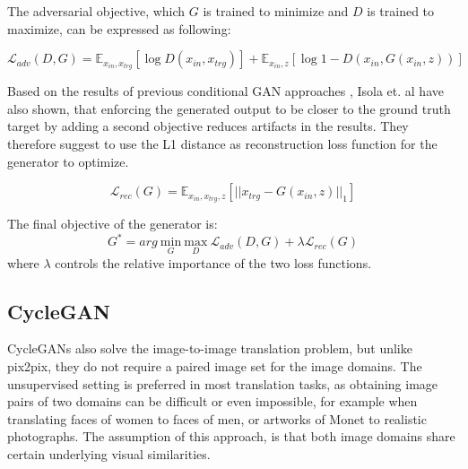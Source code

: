 \documentclass{article}
\begin{document}
The adversarial objective, which $G$ is trained to minimize and $D$ is trained to maximize, can be expressed as following:

\begin{equation}
\mathcal{L}_{adv}(D,G) = \mathbb{E}_{x_{in},x_{trg}}[\log D(x_{in},x_{trg})] + \mathbb{E}_{x_{in},z}[\log 1 - D(x_{in}, G(x_{in},z))]
\label{eq:pix2pix_minimax_cond}
\end{equation}

Based on the results of previous conditional GAN approaches \cite{pathak_context_2016}, Isola et. al \cite{isola_image--image_2016} have also shown, that enforcing the generated output to be closer to the ground truth target by adding a second objective reduces artifacts in the results. They therefore suggest to use the L1 distance as reconstruction loss function for the generator to optimize.

\begin{equation}
\mathcal{L}_{rec}(G) = \mathbb{E}_{x_{in},x_{trg},z}[||x_{trg}-G(x_{in},z)||_{1}]
\label{eq:pix2pix_loss_rec}
\end{equation}


The final objective of the generator is:
\begin{equation}
G^{*} = arg \ \underset{G}{\mathrm{min}} \ \underset{D}{\mathrm{max}} \ \mathcal{L}_{adv}(D,G) + \lambda \mathcal{L}_{rec}(G)
\end{equation}
where $\lambda$ controls the relative importance of the two loss functions.


\subsection{CycleGAN}
CycleGANs \cite{zhu_unpaired_2017} also solve the image-to-image translation problem, but unlike pix2pix, they do not require a paired image set for the image domains. The unsupervised setting is preferred in most translation tasks, as obtaining image pairs of two domains can be difficult or even impossible, for example when translating faces of women to faces of men, or artworks of Monet to realistic photographs. The assumption of this approach, is that both image domains share certain underlying visual similarities.
\end{document}
